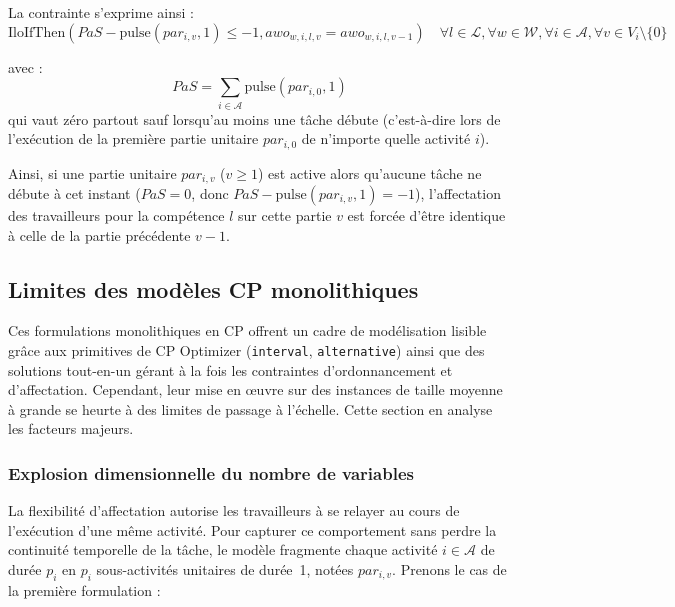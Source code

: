 \bigskip

La contrainte s'exprime ainsi :
\begin{equation}
    \text{IloIfThen}( PaS - \text{pulse}(par_{i,v},1) \leq -1 , awo_{w,i,l,v} = awo_{w,i,l,v-1}  ) \quad \forall l \in \mathcal{L},\forall w \in \mathcal{W}, \forall i \in \mathcal{A}, \forall v \in V_i \setminus\{0\} \label{cp_sym_break}
\end{equation}

\noindent avec :
\begin{equation}
     PaS = \sum_{i \in \mathcal{A}}\text{pulse}(par_{i,0} , 1)
\end{equation}
qui vaut zéro partout sauf lorsqu'au moins une tâche débute (c'est-à-dire lors de l'exécution de la première partie unitaire $par_{i,0}$ de n'importe quelle activité $i$).

Ainsi, si une partie unitaire $par_{i,v}$ ($v \geq 1$) est active alors qu'aucune tâche ne débute à cet instant ($PaS = 0$, donc $PaS - \text{pulse}(par_{i,v},1) = -1$), l'affectation des travailleurs pour la compétence $l$ sur cette partie $v$ est forcée d'être identique à celle de la partie précédente $v-1$.

\subsection{Limites des modèles CP monolithiques}

Ces formulations monolithiques en CP offrent un cadre de modélisation lisible grâce aux primitives de CP Optimizer (\texttt{interval}, \texttt{alternative}) ainsi que des solutions tout-en-un gérant à la fois les contraintes d'ordonnancement et d'affectation. Cependant, leur mise en œuvre sur des instances de taille moyenne à grande se heurte à des limites de passage à l'échelle. Cette section en analyse les facteurs majeurs.

\subsubsection{Explosion dimensionnelle du nombre de variables}

La flexibilité d'affectation autorise les travailleurs à se relayer au cours de l'exécution d'une même activité. Pour capturer ce comportement sans perdre la continuité temporelle de la tâche, le modèle fragmente chaque activité $i \in \mathcal{A}$ de durée $p_i$ en $p_i$ sous-activités unitaires de durée~1, notées $par_{i,v}$. Prenons le cas de la première formulation :

